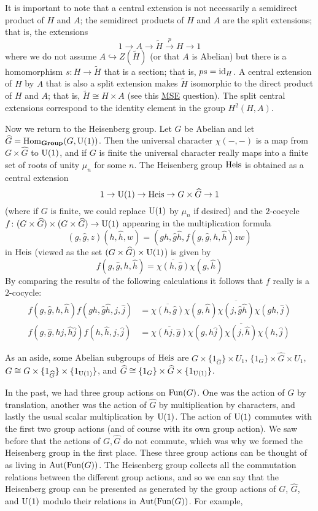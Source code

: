 \documentclass[../../rtnotes.tex]{subfiles}
\begin{document}
It is important to note that a central extension is not necessarily a semidirect product of $H$ and $A$; the semidirect products of $H$ and $A$ are the split extensions; that is, the extensions
\[1\to A\to \widetilde H\xrightarrow p H\to 1\]
where we do not assume $A\hookrightarrow Z(\widetilde H)$ (or that $A$ is Abelian) but there is a homomorphism $s\colon H \to\widetilde H$ that is a section; that is, $ps=\operatorname{id}_H$. A central extension of $H$ by $A$ that is also a split extension makes $\widetilde H$ isomorphic to the direct product of $H$ and $A$; that is, $\widetilde H \cong H\times A$ (see this \href{https://math.stackexchange.com/questions/2386212/central-extensions-versus-semidirect-products}{MSE} question). The split central extensions correspond to the identity element in the group $H^2(H,A)$.

Now we return to the Heisenberg group. Let $G$ be Abelian and let $\widehat G = \operatorname{Hom}_{{\normalfont\mathbf{Group}}}(G,\operatorname{U}(1))$. Then the universal character $\chi(-,-)$ is a map from $G\times \widehat G$ to $\operatorname{U}(1)$, and if $G$ is finite the universal character really maps into a finite set of roots of unity $\mu_n$ for some $n$. The Heisenberg group $\operatorname{Heis}$ is obtained as a central extension 
\[1\to \operatorname{U}(1)\to \operatorname{Heis}\to G\times \widehat G\to 1\]
(where if $G$ is finite, we could replace $\operatorname{U}(1)$ by $\mu_n$ if desired) and the $2$-cocycle $f\colon (G\times \widehat G)\times (G\times \widehat G)\to \operatorname{U}(1)$ appearing in the multiplication formula
\[(g,\hat g, z)(h,\hat h,w) = (gh,\hat g\hat h,f(g,\hat g,h,\hat h)zw)\]
in $\operatorname{Heis}$ (viewed as the set $(G\times \widehat G)\times \operatorname{U}(1)$) is given by 
\[f(g,\hat g,h,\hat h) = \overline{\chi(h,\hat g)}\chi(g,\hat h)\] 
By comparing the results of the following calculations it follows that $f$ really is a $2$-cocycle:
\begin{align*}
    f(g,\hat g,h,\hat h)f(gh,\hat g\hat h,j,\hat j) &= \overline{\chi(h,\hat g)}\chi(g,\hat h)\overline{\chi(j,\hat g \hat h)}\chi(gh,\hat j)\\
    f(g,\hat g,hj,\hat h \hat j)f(h,\hat h,j,\hat j) &= \overline{\chi(hj,\hat g)}\chi(g,\hat h\hat j)\overline{\chi(j,\hat h)}\chi(h,\hat j)
\end{align*}

As an aside, some Abelian subgroups of $\operatorname{Heis}$ are $G\times \{1_{\widehat G}\}\times U_1$, $\{1_G\}\times\widehat G\times U_1$, $G\cong G\times\{1_{\widehat G}\}\times \{1_{\operatorname{U}(1)}\}$, and $\widehat G\cong \{1_G\}\times \widehat G\times \{1_{\operatorname{U}(1)}\}$.

In the past, we had three group actions on $\operatorname{Fun}(G)$. One was the action of $G$ by translation, another was the action of $\widehat G$ by multiplication by characters, and lastly the usual scalar multiplication by $\operatorname{U}(1)$. The action of $\operatorname{U}(1)$ commutes with the first two group actions (and of course with its own group action). We saw before that the actions of $G,\widehat G$ do not commute, which was why we formed the Heisenberg group in the first place. These three group actions can be thought of as living in $\operatorname{Aut}(\operatorname{Fun}(G))$. The Heisenberg group collects all the commutation relations between the different group actions, and so we can say that the Heisenberg group can be presented as generated by the group actions of $G$, $\widehat G$, and $\operatorname{U}(1)$ modulo their relations in $\operatorname{Aut}(\operatorname{Fun}(G))$. For example, 
\end{document}
